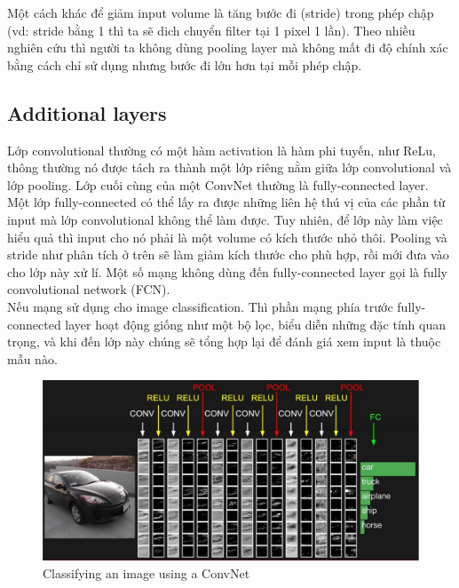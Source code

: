 Một cách khác để giảm input volume là tăng bước đi (stride) trong phép chập (vd: stride bằng 1 thì ta sẽ dich chuyển filter tại 1 pixel 1 lần). Theo nhiều nghiên cứu thì người ta không dùng pooling layer mà không mất đi độ chính xác bằng cách chỉ sử dụng nhưng bước đi lớn hơn tại mỗi phép chập.

\subsection{Additional layers}
Lớp convolutional thường có một hàm activation là hàm phi tuyến, như ReLu, thông thường nó được tách ra thành một lớp riêng nằm giữa lớp convolutional và lớp pooling.
Lớp cuối cùng của một ConvNet thường là fully-connected layer.\\

Một lớp fully-connected có thể lấy ra được những liên hệ thú vị của các phần từ input mà lớp convolutional không thể làm được. Tuy nhiên, để lớp này làm việc hiểu quả thì input cho nó phải là một volume có kích thước nhỏ thôi. Pooling và stride như phân tích ở trên sẽ làm giảm kích thước cho phù hợp, rồi mới đưa vào cho lớp này xử lí. Một số mạng không dùng đến fully-connected layer gọi là fully convolutional network (FCN).\\

Nếu mạng sử dụng cho image classification. Thì phần mạng phía trước fully-connected layer hoạt động giống như một bộ lọc, biểu diễn những đặc tính quan trọng, và khi đến lớp này chúng sẽ tổng hợp lại để đánh giá xem input là thuộc mẫu nào.
\begin{center}
    \begin{figure}[htp]
    \begin{center}
     \includegraphics[scale=.5]{image/imageClass}
    \end{center}
    \caption{Classifying an image using a ConvNet}
    \label{ref_chapter3_cnn}
    \end{figure}
\end{center}
